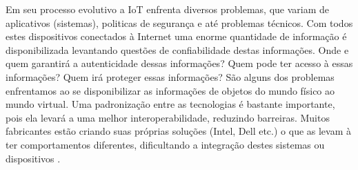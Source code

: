 Em seu processo evolutivo a IoT enfrenta diversos problemas, que variam de aplicativos (sistemas), politicas de segurança e até problemas técnicos. Com todos estes dispositivos conectados à Internet uma enorme quantidade de informação é disponibilizada levantando questões de confiabilidade destas informações. Onde e quem garantirá a autenticidade dessas informações? Quem pode ter acesso à essas informações? Quem irá proteger essas informações? São alguns dos problemas enfrentamos ao se disponibilizar as informações de objetos do mundo físico ao mundo virtual. Uma padronização entre as tecnologias é bastante importante, pois ela levará a uma melhor interoperabilidade, reduzindo barreiras. Muitos fabricantes estão criando suas próprias soluções (Intel, Dell etc.) o que as levam à ter comportamentos diferentes, dificultando a integração destes sistemas ou dispositivos \cite{IEEEORG, CMSWIRE}.